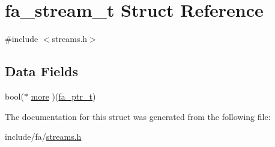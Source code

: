 \hypertarget{structfa__stream__t}{\section{fa\-\_\-stream\-\_\-t Struct Reference}
\label{structfa__stream__t}
}


{\ttfamily \#include $<$streams.\-h$>$}

\subsection*{Data Fields}
\begin{DoxyCompactItemize}
\item 
bool($\ast$ \hyperlink{group___fa_ga9a2fd49025781596abeb68c7ea7ac3c2}{more} )(\hyperlink{group___fa_ga915ddeae99ad7568b273d2b876425197}{fa\-\_\-ptr\-\_\-t})
\end{DoxyCompactItemize}


The documentation for this struct was generated from the following file\-:\begin{DoxyCompactItemize}
\item 
include/fa/\hyperlink{streams_8h}{streams.\-h}\end{DoxyCompactItemize}
